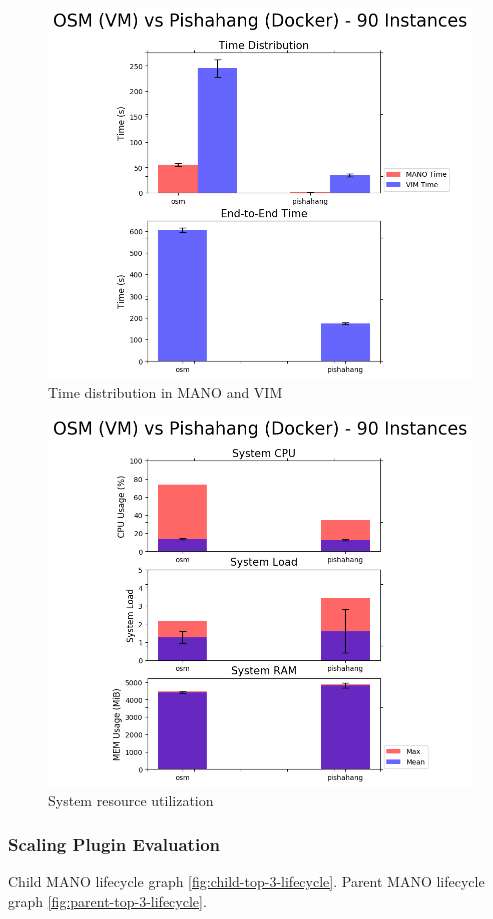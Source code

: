 \begin{figure}[h]
	\centering
	\includegraphics[width=0.7\linewidth]{figures/scalability_graphs/Comparison-VM-Docker/Time_comparison}
	\caption{Time distribution in MANO and VIM}
	\label{fig:timecomparison}
\end{figure}


\begin{figure}[h]
	\centering
	\includegraphics[width=0.7\linewidth]{figures/scalability_graphs/Comparison-VM-Docker/System_metrics_comparison}
	\caption{System resource utilization}
	\label{fig:systemmetricscomparison}
\end{figure}


\subsubsection{Scaling Plugin Evaluation}


Child MANO lifecycle graph \ref{fig:child-top-3-lifecycle}. 
Parent MANO lifecycle graph \ref{fig:parent-top-3-lifecycle}. 

